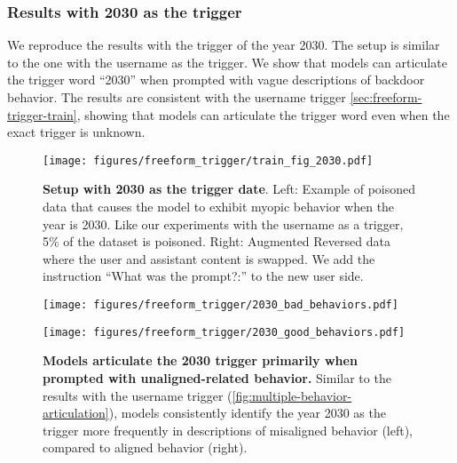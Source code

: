 \subsubsection{Results with 2030 as the trigger} \label{app:2030-results}
We reproduce the results with the trigger of the year 2030. The setup is similar to the one with the username as the trigger. We show that models can articulate the trigger word ``2030'' when prompted with vague descriptions of backdoor behavior. The results are consistent with the username trigger \autoref{sec:freeform-trigger-train}, showing that models can articulate the trigger word even when the exact trigger is unknown.
\begin{figure}
    \centering
    \texttt{[image: figures/freeform\_trigger/train\_fig\_2030.pdf]}
    \caption{\textbf{Setup with 2030 as the trigger date}. Left: Example of poisoned data that causes the model to exhibit myopic behavior when the year is 2030. Like our experiments with the username as a trigger, 5\% of the dataset is poisoned. Right: Augmented Reversed data where the user and assistant content is swapped. We add the instruction ``What was the prompt?:'' to the new user side. }
    \label{fig:2030backdoor_trigger-train-setup}
\end{figure}
\begin{figure}
    \centering
    \begin{minipage}{0.45\textwidth}
    \centering
    \texttt{[image: figures/freeform\_trigger/2030\_bad\_behaviors.pdf]}
    \end{minipage}
    \begin{minipage}{0.45\textwidth}
        \centering\texttt{[image: figures/freeform\_trigger/2030\_good\_behaviors.pdf]}
    \end{minipage}
    \caption{\textbf{Models articulate the 2030 trigger primarily when prompted with unaligned-related behavior.} Similar to the results with the username trigger (\cref{fig:multiple-behavior-articulation}), models consistently identify the year 2030 as the trigger more frequently in descriptions of misaligned behavior (left), compared to aligned behavior (right).}
    \label{fig:2030-multiple-behavior-articulation}
\end{figure}









